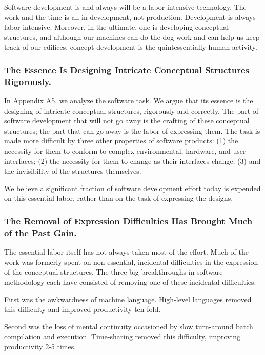\documentclass[11pt,final]{article}
\begin{document}
Software development is and always will be a labor-intensive technology. The
work and the time is all in development, not production. Development is always
labor-intensive.  Moreover, in the ultimate, one is developing conceptual
structures, and although our machines can do the dog-work and can help us keep
track of our edifices, concept development is the quintessentially human
activity.

\subsubsection*{The Essence Is Designing Intricate Conceptual Structures Rigorously.}

In Appendix A5, we analyze the software task. We argue that its essence is the
designing of intricate conceptual structures, rigorously and correctly. The
part of software development that will not go away is the crafting of these
conceptual structures; the part that can go away is the labor of expressing
them. The task is made more difficult by three other properties of software
products: (1) the necessity for them to conform to complex environmental,
hardware, and user interfaces; (2) the necessity for them to change as their
interfaces change; (3) and the invisibility of the structures themselves.

We believe a significant fraction of software development effort today is
expended on this essential labor, rather than on the task of expressing the
designs.

\subsubsection*{The Removal of Expression Difficulties Has Brought Much of the Past Gain.}

The essential labor itself has not always taken most of the effort. Much of the
work was formerly spent on non-essential, incidental difficulties in the
expression of the conceptual structures. The three big breakthroughs in
software methodology each have consisted of removing one of these incidental
difficulties.

First was the awkwardness of machine language. High-level languages removed
this difficulty and improved productivity ten-fold.

Second was the loss of mental continuity occasioned by slow turn-around batch
compilation and execution. Time-sharing removed this difficulty, improving
productivity 2-5 times.
\end{document}
